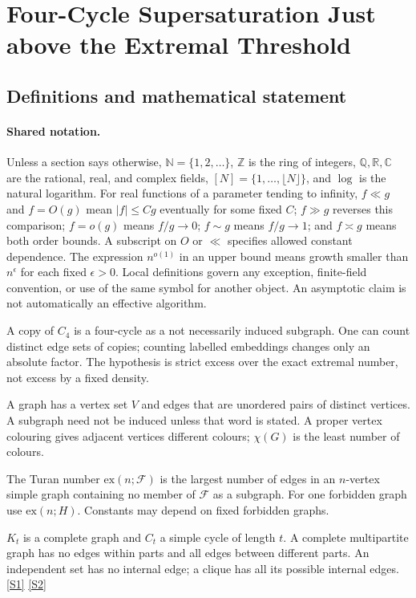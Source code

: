 \documentclass[11pt,a4paper]{article}
\newcommand{\N}{\mathbb{N}}
\newcommand{\Z}{\mathbb{Z}}
\newcommand{\Q}{\mathbb{Q}}
\newcommand{\R}{\mathbb{R}}
\newcommand{\C}{\mathbb{C}}
\newcommand{\sref}[2]{\hyperlink{source:#1:#2}{[S#2]}}
\begin{document}
\section{Four-Cycle Supersaturation Just above the Extremal Threshold}\label{statement}


\subsection{Definitions and mathematical statement}

\paragraph{Shared notation.}Unless a section says otherwise, $\N=\{1,2,\ldots\}$,
$\Z$ is the ring of integers, $\Q,\R,\C$ are the rational, real, and complex
fields, $[N]=\{1,\ldots,\lfloor N\rfloor\}$, and $\log$ is the natural
logarithm. For real functions of a parameter tending to infinity,
$f\ll g$ and $f=O(g)$ mean $|f|\leq Cg$ eventually for some fixed $C$;
$f\gg g$ reverses this comparison; $f=o(g)$ means $f/g\to0$;
$f\sim g$ means $f/g\to1$; and $f\asymp g$ means both order bounds.
A subscript on $O$ or $\ll$ specifies allowed constant dependence.
The expression $n^{o(1)}$ in an upper bound means growth smaller than
$n^\epsilon$ for each fixed $\epsilon>0$. Local definitions govern any
exception, finite-field convention, or use of the same symbol for another
object. An asymptotic claim is not automatically an effective algorithm.



A copy of $C_4$ is a four-cycle as a not necessarily induced subgraph. One can count distinct edge sets of copies; counting labelled embeddings changes only an absolute factor. The hypothesis is strict excess over the exact extremal number, not excess by a fixed density.

A graph has a vertex set $V$ and edges that are unordered pairs of distinct vertices. A subgraph need not be induced unless that word is stated. A proper vertex colouring gives adjacent vertices different colours; $\chi(G)$ is the least number of colours.

The Turan number $\mathrm{ex}(n;\mathcal F)$ is the largest number of edges in an $n$-vertex simple graph containing no member of $\mathcal F$ as a subgraph. For one forbidden graph use $\mathrm{ex}(n;H)$. Constants may depend on fixed forbidden graphs.

$K_t$ is a complete graph and $C_t$ a simple cycle of length $t$. A complete multipartite graph has no edges within parts and all edges between different parts. An independent set has no internal edge; a clique has all its possible internal edges. \sref{statement}{1} \sref{statement}{2}
\end{document}
